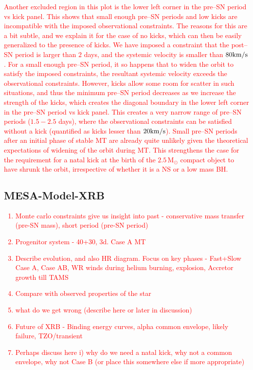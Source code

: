 \documentclass[linenumbers,trackchanges,twocolumn]{aastex701}
\newcommand{\Mdot}{\mathrm{M}_{\odot}}
\newcommand{\red}{\textcolor{red}}
\begin{document}
\red{Another excluded region in this plot is the lower left corner in the pre--SN period vs kick panel. This shows that small enough pre--SN periods and low kicks are incompatible with the imposed observational constraints. The reasons for this are a bit subtle, and we explain it for the case of no kicks, which can then be easily generalized to the presence of kicks. We have imposed a constraint that the post--SN period is larger than $2$ days, and the systemic velocity is smaller than $80\rm km/s$. For a small enough pre--SN period, it so happens that to widen the orbit to satisfy the imposed constraints, the resultant systemic velocity exceeds the observational constraints. However, kicks allow some room for scatter in such situations, and thus the minimum pre--SN period decreases as we increase the strength of the kicks, which creates the diagonal boundary in the lower left corner in the pre--SN period vs kick panel.
This creates a very narrow range of pre--SN periods ($1.5-2.5$ days), where the observational constraints can be satisfied without a kick (quantified as kicks lesser than $20 \rm km/s$). Small pre--SN periods after an initial phase of stable MT are already quite unlikely given the theoretical expectations of widening of the orbit during MT. This strengthens the case for the requirement for a natal kick at the birth of the $2.5 \,\Mdot$ compact object to have shrunk the orbit, irrespective of whether it is a NS or a low mass BH.}

\subsection{MESA-Model-XRB}\label{sec:mesa_xrb}

\red{
\begin{enumerate}
    \item Monte carlo constraints give us insight into past - conservative mass transfer (pre-SN mass), short period (pre-SN period)
    \item Progenitor system - 40+30, 3d. Case A MT
    \item Describe evolution, and also HR diagram. Focus on key phases - Fast+Slow Case A, Case AB, WR winds during helium burning, explosion, Accretor growth till TAMS
    \item Compare with observed properties of the star
    \item what do we get wrong (describe here or later in discussion)
    \item Future of XRB - Binding energy curves, alpha common envelope, likely failure, TZO/transient
    \item Perhaps discuss here i) why do we need a natal kick, why not a common envelope, why not Case B (or place this somewhere else if more appropriate)
\end{enumerate}
}
\end{document}
